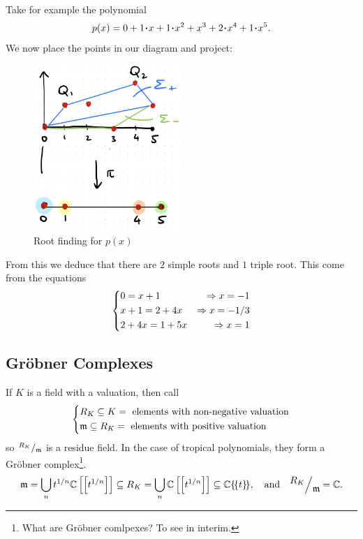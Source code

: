 \documentclass[12pt]{memoir}
\begin{document}
\begin{Ex}
    Take for example the polynomial 
    $$p(x)=0+1\.x+1\.x^2+x^3+2\.x^4+1\.x^5.$$
    We now place the points in our diagram and project:
    \begin{figure}[h!]
        \centering
        \includegraphics[width=0.5\textwidth]{figs/fig6-2CombinatorializationExample.png}
        \caption{Root finding for $p(x)$}
        \label{fig:6.2-CombinatorializationExample}
    \end{figure}
    From this we deduce that there are $2$ simple roots and $1$ triple root. This come from the equations
    $$
    \left\lbrace
    \begin{aligned}
        &0=x+1&\Rightarrow x=-1\\
        &x+1=2+4x&\Rightarrow x=-1/3\\
        &2+4x=1+5x&\Rightarrow x=1
    \end{aligned}
    \right.
    $$
\end{Ex}

\subsection{Gr\"obner Complexes}

If $K$ is a field with a valuation, then call
$$
\left\lbrace
\begin{aligned}
    &R_K\subseteq K=\text{ elements with non-negative valuation}\\
    &\mathfrak{m}\subseteq R_K=\text{ elements with positive valuation}
\end{aligned}
\right.
$$
so $\quot{R_K}{\lie{m}}$ is a residue field. In the case of tropical polynomials, they form a Gr\"obner complex\footnote{What are Gr\"obner comlpexes? To see in interim.}.
$$\lie{m}=\bigcup_nt^{1/n}\bC\bonj{\bonj{t^{1/n}}}\subseteq R_K=\bigcup_n\bC\bonj{\bonj{t^{1/n}}}\subseteq\bC\{\!\{t\}\!\},\word{and}\quot{R_K}{\lie{m}}=\bC.$$
\end{document}
